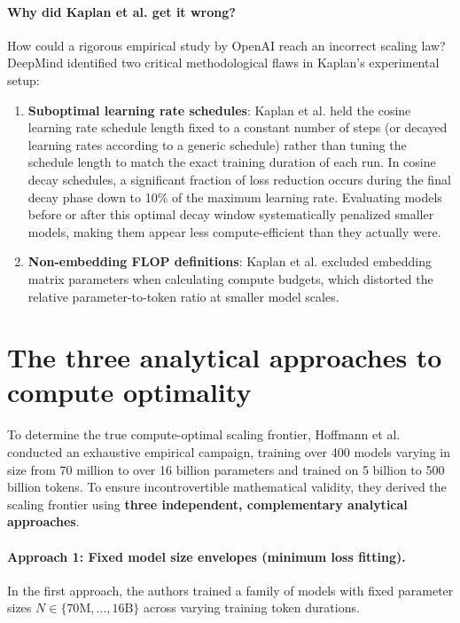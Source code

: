 \documentclass[../../main.tex]{subfiles}
\begin{document}
\paragraph{Why did Kaplan et al. get it wrong?}
How could a rigorous empirical study by OpenAI reach an incorrect scaling law? DeepMind identified two critical methodological flaws in Kaplan's experimental setup:
\begin{enumerate}
    \item \textbf{Suboptimal learning rate schedules}: Kaplan et al. held the cosine learning rate schedule length fixed to a constant number of steps (or decayed learning rates according to a generic schedule) rather than tuning the schedule length to match the exact training duration of each run. In cosine decay schedules, a significant fraction of loss reduction occurs during the final decay phase down to 10\% of the maximum learning rate. Evaluating models before or after this optimal decay window systematically penalized smaller models, making them appear less compute-efficient than they actually were.
    \item \textbf{Non-embedding FLOP definitions}: Kaplan et al. excluded embedding matrix parameters when calculating compute budgets, which distorted the relative parameter-to-token ratio at smaller model scales.
\end{enumerate}

\section{The three analytical approaches to compute optimality}
\label{sec:three_approaches}

To determine the true compute-optimal scaling frontier, Hoffmann et al.~\cite{hoffmann2022} conducted an exhaustive empirical campaign, training over 400 models varying in size from 70 million to over 16 billion parameters and trained on 5 billion to 500 billion tokens. To ensure incontrovertible mathematical validity, they derived the scaling frontier using \textbf{three independent, complementary analytical approaches}.

\paragraph{Approach 1: Fixed model size envelopes (minimum loss fitting).}
In the first approach, the authors trained a family of models with fixed parameter sizes $N \in \{70\text{M}, \dots, 16\text{B}\}$ across varying training token durations. 
\end{document}
